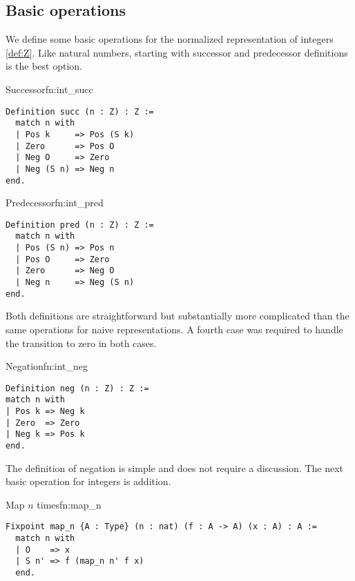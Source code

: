 \subsection{Basic operations}
We define some basic operations for the normalized representation of integers \ref{def:Z}. Like natural numbers, starting with successor and predecessor definitions is the best option.
\begin{func}{Successor}{fn:int_succ}
\begin{verbatim}
Definition succ (n : Z) : Z :=
  match n with
  | Pos k     => Pos (S k)
  | Zero      => Pos O
  | Neg O     => Zero
  | Neg (S n) => Neg n
end.
\end{verbatim}
\end{func}
\begin{func}{Predecessor}{fn:int_pred}
\begin{verbatim}
Definition pred (n : Z) : Z :=
  match n with
  | Pos (S n) => Pos n
  | Pos O     => Zero
  | Zero      => Neg O
  | Neg n     => Neg (S n)
end.
\end{verbatim}
\end{func}
Both definitions are straightforward but substantially more complicated than the same operations for naive representations. A fourth case was required to handle the transition to zero in both cases.
\begin{func}{Negation}{fn:int_neg}
\begin{verbatim}
Definition neg (n : Z) : Z :=
match n with
| Pos k => Neg k
| Zero  => Zero
| Neg k => Pos k
end.
\end{verbatim}
\end{func}
The definition of negation is simple and does not require a discussion. The next basic operation for integers is addition.
\begin{func}{Map $n$ times}{fn:map_n}
\begin{verbatim}
Fixpoint map_n {A : Type} (n : nat) (f : A -> A) (x : A) : A :=
  match n with
  | O    => x
  | S n' => f (map_n n' f x)
  end.
\end{verbatim}
\end{func}
  
